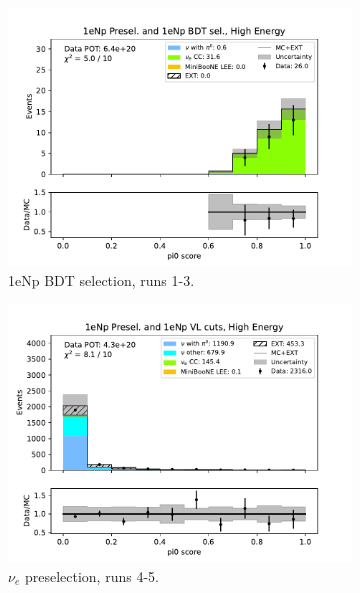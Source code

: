 \begin{figure}[H]
\begin{subfigure}{0.33\linewidth}
    \includegraphics[width=\linewidth]{technote/Sidebands/Figures/FarSideband/far_sideband_pi0_score_run123_NP_NPBDT_HIGH_ENERGY.pdf}
    \caption{1eNp BDT selection, runs 1-3.}
    \end{subfigure}
    \begin{subfigure}{0.33\linewidth}
    \includegraphics[width=\linewidth]{technote/Sidebands/Figures/FarSideband/far_sideband_pi0_score_run4b4c4d5_NP_NP_HIGH_ENERGY.pdf}
    \caption{$\nu_e$ preselection, runs 4-5.}
    \end{subfigure}%
    \begin{subfigure}{0.33\linewidth}

\end{subfigure}
\end{figure}
